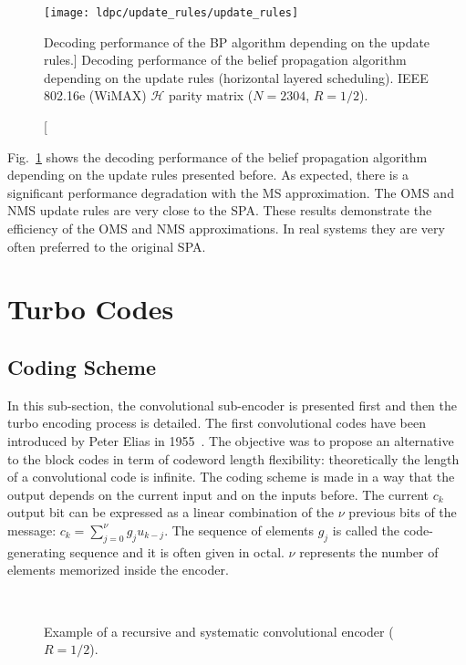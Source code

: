 \begin{figure}[htp]
  \centering
  \texttt{[image: ldpc/update\_rules/update\_rules]}
  \caption
    [Decoding performance of the BP algorithm depending on the update rules.]
    {Decoding performance of the belief propagation algorithm depending on the
     update rules (horizontal layered scheduling). IEEE 802.16e (WiMAX)
     $\mathcal{H}$ parity matrix ($N=2304$, $R=1/2$).}
  \label{fig:alg_ldpc_update_rules}
\end{figure}

Fig.~\ref{fig:alg_ldpc_update_rules} shows the decoding performance of the
belief propagation algorithm depending on the update rules presented before.
As expected, there is a significant performance degradation with the MS
approximation. The OMS and NMS update rules are very close to the SPA. These
results demonstrate the efficiency of the OMS and NMS approximations. In real
systems they are very often preferred to the original SPA.

\section{Turbo Codes}

\subsection{Coding Scheme}

In this sub-section, the convolutional sub-encoder is presented first and then
the turbo encoding process is detailed. The first convolutional codes have been
introduced by Peter Elias in 1955~\cite{Elias1955}. The objective was to propose
an alternative to the block codes in term of codeword length flexibility:
theoretically the length of a convolutional code is infinite. The coding scheme
is made in a way that the output depends on the current input and on the inputs
before. The current $c_k$ output bit can be expressed as a linear combination of
the $\nu$ previous bits of the message:
$c_k = \sum\limits_{j=0}^\nu g_ju_{k-j}$. The sequence of elements $g_j$ is
called the code-generating sequence and it is often given in octal. $\nu$
represents the number of elements memorized inside the encoder.

\begin{figure}[htp]
  \centering
  \quad
  \\
  \caption{Example of a recursive and systematic convolutional encoder ($R =
    1/2$).}
  \label{fig:alg_turbo_sub_encoder}
\end{figure}

